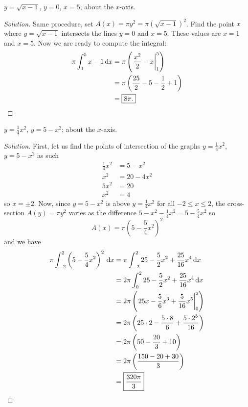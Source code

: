 \begin{problem}
$y=\sqrt{x-1}$, $y=0$, $x=5$; about the $x$-axis.
\end{problem}
\begin{proof}[Solution]
Same procedure, set $A(x)=\pi y^2=\pi\left(\sqrt{x-1}\right)^2$. Find the
point $x$ where $y=\sqrt{x-1}$ intersects the lines $y=0$ and $x=5$. These
values are $x=1$ and $x=5$. Now we are ready to compute the integral:
\begin{align*}
\pi\int_1^5x-1\,\mathrm{d} x
&=\pi\left(\left.\frac{x^2}{2}-x\right|_1^5\right)\\
&=\pi\left(\frac{25}{2}-5-\frac{1}{2}+1\right)\\
&=\boxed{8\pi.}
\end{align*}
\end{proof}

\begin{problem}
$y=\frac{1}{4}x^2$, $y=5-x^2$; about the $x$-axis.
\end{problem}
\begin{proof}[Solution]
First, let us find the points of intersection of the graphs
$y=\frac{1}{4}x^2$, $y=5-x^2$ as such
\begin{align*}
\frac{1}{4}x^2&=5-x^2\\
x^2&=20-4x^2\\
5x^2&=20\\
x^2&=4
\end{align*}
so $x=\pm 2$. Now, since $y=5-x^2$ is above $y=\frac{1}{4}x^2$ for all
$-2\leq x\leq 2$, the cross-section $A(y)=\pi y^2$ varies as the difference
$5-x^2-\frac{1}{4}x^2=5-\frac{5}{4}x^2$ so
\[
A(x)=\pi\left(5-\frac{5}{4}x^2\right)^2
\]
and we have
\begin{align*}
\pi\int_{-2}^2 \left(5-\frac{5}{4}x^2\right)^2\,\mathrm{d} x
&=\pi\int_{-2}^225-\frac{5}{2}x^2+\frac{25}{16}x^4\,\mathrm{d} x
\\
&=2\pi\int_0^225-\frac{5}{2}x^2+\frac{25}{16}x^4\,\mathrm{d} x
\\
&=2\pi\left(\left.25x-\frac{5}{6}x^3+\frac{5}{16}x^5\right|_0^2\right)\\
&=2\pi\left(25\cdot 2-\frac{5\cdot 8}{6}+\frac{5\cdot 2^5}{16}\right)\\
&=2\pi\left(50-\frac{20}{3}+10\right)\\
&=2\pi\left(\frac{150-20+30}{3}\right)\\
&=\boxed{\frac{320\pi}{3}}
\end{align*}
\end{proof}

